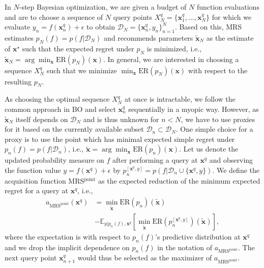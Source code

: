\documentclass[10pt,letterpaper]{article} %
\begin{document}
In $N$-step Bayesian optimization, we are given a budget of $N$ function evaluations and are to choose a sequence of $N$ query points
$X^q_N=\{\mathbf{x}^q_1, \dots, \mathbf{x}^q_N\}$ for which we evaluate $y_n = f(\mathbf{x}^q_n) +
\epsilon$ to obtain $\mathcal{D}_N = \{\mathbf{x}^q_n, y_n\}_{n=1}^N$. Based on this, MRS
estimates $p_N(f) = p(f \vert \mathcal{D}_N)$  and recommends parameters
$\mathbf{\tilde x}_N$ as the estimate of $\mathbf{x}^\star$ such that the
expected regret under $p_N$ is minimized, i.e., $\mathbf{\tilde x}_N = \arg\min_\mathbf{x}
\text{ER}(p_N)(\mathbf{x})$.
 In general, we are interested in choosing a
sequence $X^q_N$ such that we minimize
$\min_\mathbf{x} \text{ER}(p_N)(\mathbf{x})$ with respect to the resulting $p_N$.

As choosing the optimal sequence $X^q_N$ at once is intractable, we follow the
common approach in BO and select $\mathbf{x}^q_n$
sequentially in a myopic way. However, as $\mathbf{\tilde x}_N$ itself depends
on $\mathcal{D}_N$ and is thus unknown for $n < N$, we have to use proxies for it based on the currently
available subset $\mathcal{D}_n \subset \mathcal{D}_N$.  One simple choice for a proxy is to use
the point which has minimal expected simple regret under $p_n(f) =
p(f \vert \mathcal{D}_n)$, i.e.,
$\mathbf{\tilde x} = \arg\min_\mathbf{x} \text{ER}(p_n)(\mathbf{x})$.
Let us denote the updated
probability measure on $f$ after performing a query at $\mathbf{x}^q$ and
observing the function value $y=f(\mathbf{x}^q) + \epsilon$ by
$p^{[\mathbf{x}^q, y]}_n = p(f\vert \mathcal{D}_n \cup \{\mathbf{x}^q, y\})$.
We define the acquisition function MRS$^{\text{point}}$ as the expected reduction of the minimum expected regret for a query at
$\mathbf{x}^q$, i.e.,
\begin{equation*}
\begin{split}
a_{\text{MRS}^{\text{point}}}(\mathbf{x}^q)
    & = \min_{\mathbf{\tilde x}}\text{ER}(p_n)(\mathbf{\tilde x}) \\
     &- \mathbb{E}_{y \vert p_n(f), \mathbf{x}^q}[\min_{\mathbf{\tilde x}}  \text{ER}(p^{[\mathbf{x}^q, y]}_n)(\mathbf{\tilde x})],
\end{split}
\end{equation*}
where the expectation is with
respect to $p_n(f)$'s predictive distribution at $\mathbf{x}^q$ and we drop the
implicit dependence on $p_n(f)$ in the notation of $a_{\text{MRS}^{\text{point}}}$.
The next query point $\mathbf{x}^q_{n+1}$ would thus be selected as the maximizer of
$a_{\text{MRS}^{\text{point}}}$.
\end{document}
